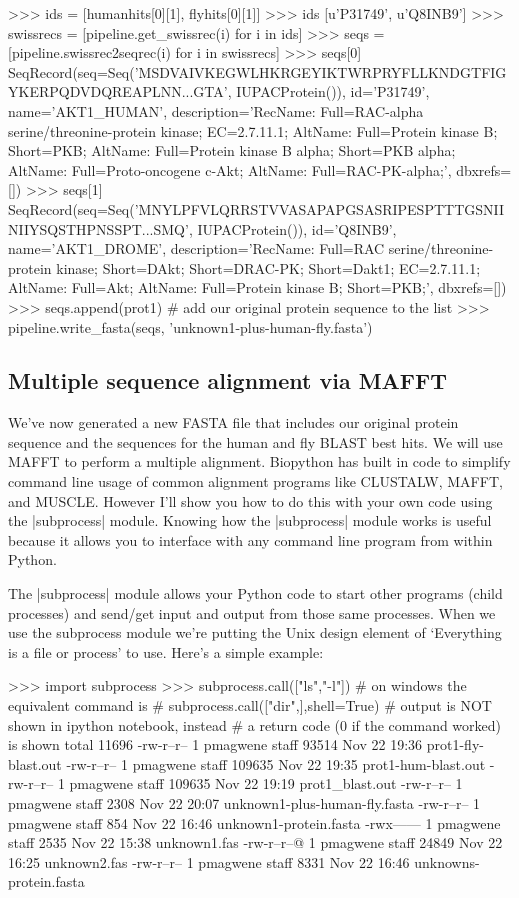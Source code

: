 \begin{python}
>>> ids = [humanhits[0][1], flyhits[0][1]]
>>> ids
[u'P31749', u'Q8INB9']
>>> swissrecs = [pipeline.get_swissrec(i) for i in ids]
>>> seqs = [pipeline.swissrec2seqrec(i) for i in swissrecs]
>>> seqs[0]
SeqRecord(seq=Seq('MSDVAIVKEGWLHKRGEYIKTWRPRYFLLKNDGTFIGYKERPQDVDQREAPLNN...GTA', IUPACProtein()), id='P31749', name='AKT1_HUMAN', description='RecName: Full=RAC-alpha serine/threonine-protein kinase; EC=2.7.11.1; AltName: Full=Protein kinase B; Short=PKB; AltName: Full=Protein kinase B alpha; Short=PKB alpha; AltName: Full=Proto-oncogene c-Akt; AltName: Full=RAC-PK-alpha;', dbxrefs=[])
>>> seqs[1]
SeqRecord(seq=Seq('MNYLPFVLQRRSTVVASAPAPGSASRIPESPTTTGSNIINIIYSQSTHPNSSPT...SMQ', IUPACProtein()), id='Q8INB9', name='AKT1_DROME', description='RecName: Full=RAC serine/threonine-protein kinase; Short=DAkt; Short=DRAC-PK; Short=Dakt1; EC=2.7.11.1; AltName: Full=Akt; AltName: Full=Protein kinase B; Short=PKB;', dbxrefs=[])
>>> seqs.append(prot1)  # add our original protein sequence to the list
>>> pipeline.write_fasta(seqs, 'unknown1-plus-human-fly.fasta')
\end{python}


\subsection{Multiple sequence alignment via MAFFT}

We've now generated a new FASTA file that includes our original protein sequence and the sequences for the human and fly BLAST best hits.  We will use MAFFT to perform a multiple alignment. Biopython has built in code to simplify command line usage of common alignment programs like CLUSTALW, MAFFT, and MUSCLE.  However I'll show you how to do this with your own code using the |subprocess| module.  Knowing how the |subprocess| module works is useful because it allows you to interface with any command line program from within Python.

The |subprocess| module allows your Python code to start other programs (child processes) and send/get input and output from those same processes. When we use the subprocess module we're putting the Unix design element of `Everything is a file or process' to use. Here's a simple example:

\begin{python}
>>> import subprocess
>>> subprocess.call(["ls","-l"])
# on windows the equivalent command is
# subprocess.call(["dir",],shell=True)
# output is NOT shown in ipython notebook, instead
# a return code (0 if the command worked) is shown
total 11696
-rw-r--r--   1 pmagwene  staff    93514 Nov 22 19:36 prot1-fly-blast.out
-rw-r--r--   1 pmagwene  staff   109635 Nov 22 19:35 prot1-hum-blast.out
-rw-r--r--   1 pmagwene  staff   109635 Nov 22 19:19 prot1_blast.out
-rw-r--r--   1 pmagwene  staff     2308 Nov 22 20:07 unknown1-plus-human-fly.fasta
-rw-r--r--   1 pmagwene  staff      854 Nov 22 16:46 unknown1-protein.fasta
-rwx------   1 pmagwene  staff     2535 Nov 22 15:38 unknown1.fas
-rw-r--r--@  1 pmagwene  staff    24849 Nov 22 16:25 unknown2.fas
-rw-r--r--   1 pmagwene  staff     8331 Nov 22 16:46 unknowns-protein.fasta
\end{python}

